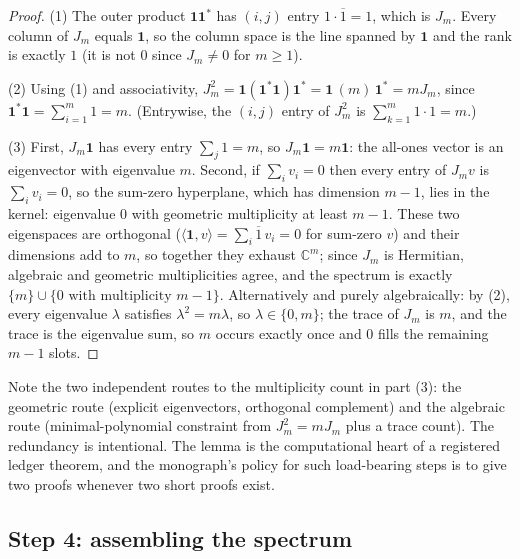 \begin{proof}
(1) The outer product $\mathbf{1}\mathbf{1}^{*}$ has $(i,j)$ entry
$1\cdot\overline{1}=1$, which is $J_m$. Every column of $J_m$ equals
$\mathbf{1}$, so the column space is the line spanned by $\mathbf{1}$ and the
rank is exactly $1$ (it is not $0$ since $J_m\neq 0$ for $m\geq 1$).

(2) Using (1) and associativity,
$J_m^2=\mathbf{1}(\mathbf{1}^{*}\mathbf{1})\mathbf{1}^{*}
=\mathbf{1}\,(m)\,\mathbf{1}^{*}=mJ_m$,
since $\mathbf{1}^{*}\mathbf{1}=\sum_{i=1}^m 1=m$. (Entrywise, the $(i,j)$
entry of $J_m^2$ is $\sum_{k=1}^m 1\cdot 1=m$.)

(3) First, $J_m\mathbf{1}$ has every entry $\sum_j 1=m$, so
$J_m\mathbf{1}=m\mathbf{1}$: the all-ones vector is an eigenvector with
eigenvalue $m$. Second, if $\sum_i v_i=0$ then every entry of $J_m v$ is
$\sum_i v_i=0$, so the sum-zero hyperplane, which has dimension $m-1$, lies
in the kernel: eigenvalue $0$ with geometric multiplicity at least $m-1$.
These two eigenspaces are orthogonal
($\langle\mathbf{1},v\rangle=\sum_i \overline{1}\, v_i=0$ for sum-zero $v$)
and their dimensions add to $m$, so together they exhaust $\mathbb{C}^m$;
since $J_m$ is Hermitian, algebraic and geometric multiplicities agree, and
the spectrum is exactly $\{m\}\cup\{0\text{ with multiplicity } m-1\}$.
Alternatively and purely algebraically: by (2), every eigenvalue $\lambda$
satisfies $\lambda^2=m\lambda$, so $\lambda\in\{0,m\}$; the trace of $J_m$ is
$m$, and the trace is the eigenvalue sum, so $m$ occurs exactly once and $0$
fills the remaining $m-1$ slots.
\end{proof}

Note the two independent routes to the multiplicity count in part (3): the
geometric route (explicit eigenvectors, orthogonal complement) and the
algebraic route (minimal-polynomial constraint from $J_m^2=mJ_m$ plus a trace
count). The redundancy is intentional. The lemma is the computational heart
of a registered ledger theorem, and the monograph's policy for such
load-bearing steps is to give two proofs whenever two short proofs exist.

\subsection{Step 4: assembling the spectrum}

